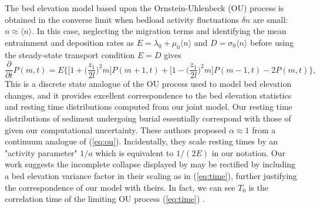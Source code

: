 \documentclass[draft]{agujournal2018}
\newcommand\be{\begin{equation}} %
\newcommand\ee{\end{equation}}   %
\newcommand\bra{\langle}
\newcommand\ket{\rangle}
\begin{document}
The \citet{Martin2014} bed elevation model based upon the Ornstein-Uhlenbeck (OU) process is obtained in the converse limit when bedload activity fluctuations $\delta n$ are small: $n \approx \bra n \ket$.
In this case, neglecting the migration terms and identifying the mean entrainment and deposition rates as $E =\lambda_0 + \mu_0 \bra n \ket$ and $D = \sigma_0 \bra n \ket$ before using the steady-state transport condition $E=D$ \citep[e.g.][]{Einstein1950} gives
\be \frac{\partial}{\partial t}P(m,t) =  E \Big\{ \Big[1 +\Big(\frac{z_1}{2 l}\Big)^2m\Big]P(m+1,t) +  \Big[1 -\Big(\frac{z_1}{2 l}\Big)^2m\Big]P(m-1,t) - 2P(m,t)\Big\}, \label{eq:ou}\ee
This is a discrete state analogue of the OU process \citet{Martin2014} used to model bed elevation changes, and it provides excellent correspondence to the bed elevation statistics and resting time distributions computed from our joint model.
Our resting time distributions of sediment undergoing burial essentially correspond with those of \citet{Martin2014} given our computational uncertainty.
These authors proposed $\alpha \approx 1 $ from a continuum analogue of (\ref{eq:ou}).
Incidentally, they scale resting times by an "activity parameter" $1/a$ which is equivalent to $1/(2E)$ in our notation.
Our work suggests the incomplete collapse displayed by \citet{Martin2014} may be rectified by including a bed elevation variance factor in their scaling as in (\ref{eq:time}), further justifying the correspondence of our model with theirs.
In fact, we can see $T_0$ is the correlation time of the limiting OU process (\ref{eq:time}) \citep[e.g.][]{Gardiner1983}.
\end{document}
